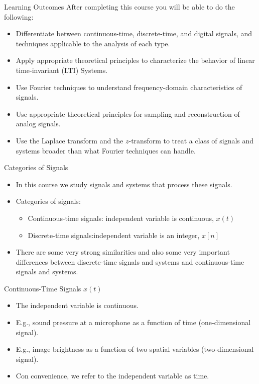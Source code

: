 \begin{frame}{Learning Outcomes}
    After completing this course you will be able to do the following:
    \begin{itemize}[<+->]
        \item Differentiate between continuous-time, discrete-time, and digital signals, and techniques applicable to the analysis of each type.
        \item Apply appropriate theoretical principles to characterize the behavior of linear time-invariant (LTI) Systems.
        \item Use Fourier techniques to understand frequency-domain characteristics of signals.
        \item Use appropriate theoretical principles for sampling and reconstruction of analog signals.
        \item Use the Laplace transform and the $z$-transform to treat a class of signals and systems broader than what Fourier techniques can handle.
    \end{itemize}
\end{frame}


\begin{frame}{Categories of Signals}
    \begin{itemize}[<+->]
        \item In this course we study signals and systems that process these signals.
        \item Categories of signals:
            \begin{itemize}
                \item Continuous-time signals: independent variable is continuous, $x(t)$
                \item Discrete-time signals:independent variable is an integer,  $x[n]$
            \end{itemize}
        \item There are some very strong similarities and also some very important differences between discrete-time signals and systems and continuous-time signals and systems.
    \end{itemize}
\end{frame}


\begin{frame}{Continuous-Time Signals $x(t)$}
    \begin{itemize}
        \item The independent variable is continuous.
        \item E.g., sound pressure at a microphone as a function of time (one-dimensional signal).
        \item E.g., image brightness as a function of two spatial variables (two-dimensional signal).
        \item Con convenience, we refer to the independent variable as time.
    \end{itemize}
\end{frame}

